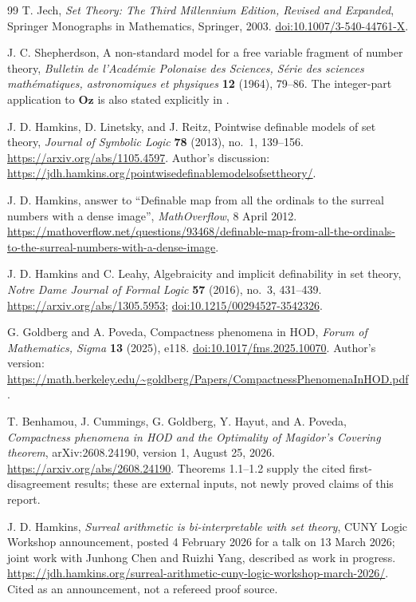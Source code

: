 \documentclass[11pt,a4paper]{article}
\numberwithin{equation}{section}
\theoremstyle{definition}
\theoremstyle{remark}
\newcommand{\Oz}{\mathbf{Oz}}
\begin{document}
\begin{thebibliography}{99}
T. Jech, \emph{Set Theory: The Third Millennium Edition, Revised and
Expanded}, Springer Monographs in Mathematics, Springer, 2003.
\href{https://doi.org/10.1007/3-540-44761-X}{doi:10.1007/3-540-44761-X}.

J. C. Shepherdson,
A non-standard model for a free variable fragment of number theory,
\emph{Bulletin de l'Acad\'emie Polonaise des Sciences, S\'erie des
sciences math\'ematiques, astronomiques et physiques}
\textbf{12} (1964), 79--86.
The integer-part application to $\Oz$ is also stated explicitly
in \cite[Section 1.1]{LM}.

J. D. Hamkins, D. Linetsky, and J. Reitz,
Pointwise definable models of set theory,
\emph{Journal of Symbolic Logic} \textbf{78} (2013), no.~1, 139--156.
\url{https://arxiv.org/abs/1105.4597}.
Author's discussion:
\url{https://jdh.hamkins.org/pointwisedefinablemodelsofsettheory/}.

J. D. Hamkins, answer to ``Definable map from all the ordinals to the
surreal numbers with a dense image'', \emph{MathOverflow}, 8 April 2012.
\url{https://mathoverflow.net/questions/93468/definable-map-from-all-the-ordinals-to-the-surreal-numbers-with-a-dense-image}.

J. D. Hamkins and C. Leahy,
Algebraicity and implicit definability in set theory,
\emph{Notre Dame Journal of Formal Logic} \textbf{57} (2016),
no.~3, 431--439.
\url{https://arxiv.org/abs/1305.5953};
\href{https://doi.org/10.1215/00294527-3542326}
{doi:10.1215/00294527-3542326}.

G. Goldberg and A. Poveda,
Compactness phenomena in HOD,
\emph{Forum of Mathematics, Sigma} \textbf{13} (2025), e118.
\href{https://doi.org/10.1017/fms.2025.10070}
{doi:10.1017/fms.2025.10070}.
Author's version:
\url{https://math.berkeley.edu/~goldberg/Papers/CompactnessPhenomenaInHOD.pdf}.

T. Benhamou, J. Cummings, G. Goldberg, Y. Hayut, and A. Poveda,
\emph{Compactness phenomena in HOD and the Optimality of Magidor's
Covering theorem}, arXiv:2608.24190, version 1, August 25, 2026.
\url{https://arxiv.org/abs/2608.24190}.
Theorems 1.1--1.2 supply the cited first-disagreement results;
these are external inputs, not newly proved claims of this report.

J. D. Hamkins, \emph{Surreal arithmetic is bi-interpretable with set
theory}, CUNY Logic Workshop announcement, posted 4 February 2026 for a
talk on 13 March 2026; joint work with Junhong Chen and Ruizhi Yang,
described as work in progress.
\url{https://jdh.hamkins.org/surreal-arithmetic-cuny-logic-workshop-march-2026/}.
Cited as an announcement, not a refereed proof source.


\end{thebibliography}
\end{document}
